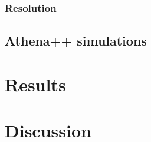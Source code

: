 \documentclass[twocolumn]{aastex631}
\begin{document}
\subsubsection{Resolution}

\subsection{Athena++ simulations}

\section{Results}
\label{sec:results}

\section{Discussion} 
\label{sec:conclusion}


\end{document}
